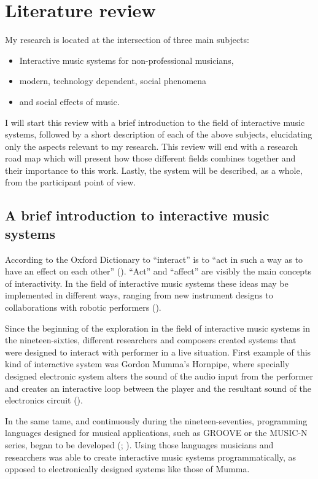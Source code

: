 \section{Literature review}

My research is located at the intersection of three main subjects:
\begin{itemize}
	\item Interactive music systems for non-professional musicians,
	\item modern, technology dependent, social phenomena
	\item and social effects of music.
\end{itemize}
I will start this review with a brief introduction to the field of interactive music systems, followed by a short description of each of the above subjects, elucidating only the aspects relevant to my research.
This review will end with a research road map which will present how those different fields combines together and their importance to this work.
Lastly, the system will be described, as a whole, from the participant point of view.

\subsection{A brief introduction to interactive music systems}

According to the Oxford Dictionary to ``interact'' is to ``act in such a way as to have an effect on each other'' (\cite{web:oxford}).
``Act'' and ``affect'' are visibly the main concepts of interactivity.
In the field of interactive music systems these ideas may be implemented in different ways, ranging from new instrument designs to collaborations with robotic performers (\cite{drummond09}).

Since the beginning of the exploration in the field of interactive music systems in the nineteen-sixties, different researchers and composers created systems that were designed to interact with performer in a live situation.
First example of this kind of interactive system was Gordon Mumma's Hornpipe, where specially designed electronic system alters the sound of the audio input from the performer and creates an interactive loop between the player and the resultant sound of the electronics circuit (\cite[page 12]{winkler01}).

In the same tame, and continuously during the nineteen-seventies, programming languages designed for musical applications, such as GROOVE or the MUSIC-N series, began to be developed (\cite{mathews70}; \cite{mathews69}).
Using those languages musicians and researchers was able to create interactive music systems programmatically, as opposed to electronically designed systems like those of Mumma.

